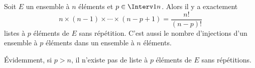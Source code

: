 \documentclass[a4paper,10pt]{report}
\begin{document}
\begin{Demonstration}{} 

\vspace{3cm}
%
\end{Demonstration}
 
%
%



\begin{Proposition}{}
Soit $E$ un ensemble à $n$ éléments et $p \in \Interv 1n$. Alors il y a exactement 
\[  n \times (n-1) \times \cdots \times (n-p+1)  = \frac{n!}{(n-p)!} \]
listes à $p$ éléments de $E$ sans répétition. C'est aussi le nombre d'injections d'un ensemble à $p$ éléments dans un ensemble à $n$ éléments.
\end{Proposition}

\begin{Demonstration}{} 
\vspace{7cm}
\end{Demonstration}

\begin{Remarque}{} 
Évidemment, si $p>n$, il n'existe pas de liste à $p$ éléments de $E$ sans répétitions.
\end{Remarque}
%
%
\end{document}
